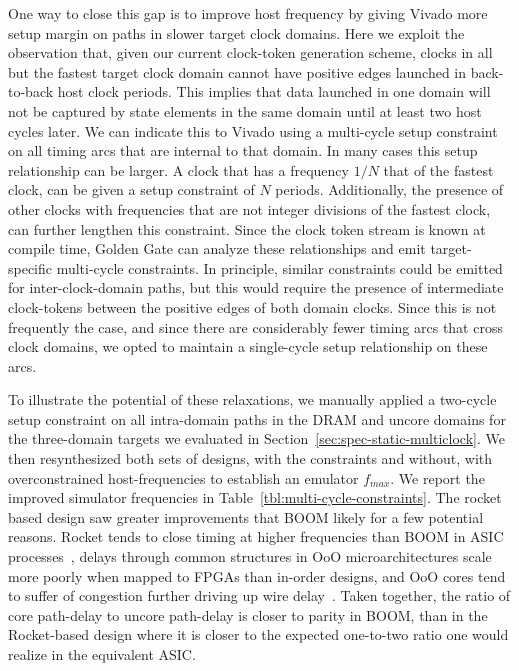 One way to close this gap is to improve host frequency by giving Vivado more
setup margin on paths in slower target clock domains. Here we exploit the
observation that, given our current clock-token generation scheme, clocks in
all but the fastest target clock domain cannot have positive edges launched in
back-to-back host clock periods. This implies that data launched in one domain
will not be captured by state elements in the same domain until at least two
host cycles later. We can indicate this to Vivado using a multi-cycle setup
constraint on all timing arcs that are internal to that domain. In many cases
this setup relationship can be larger. A clock that has a frequency $1/N$ that
of the fastest clock, can be given a setup constraint of $N$ periods.
Additionally, the presence of other clocks with frequencies that are not
integer divisions of the fastest clock, can further lengthen this constraint.
Since the clock token stream is known at compile time, Golden Gate can analyze
these relationships and emit target-specific multi-cycle constraints.  In
principle, similar constraints could be emitted for inter-clock-domain paths,
but this would require the presence of intermediate clock-tokens between the
positive edges of both domain clocks. Since this is not frequently the case,
and since there are considerably fewer timing arcs that cross clock domains, we
opted to maintain a single-cycle setup relationship on these arcs.

To illustrate the potential of these relaxations, we manually applied a
two-cycle setup constraint on all intra-domain paths in the DRAM and uncore
domains for the three-domain targets we evaluated in
Section~\ref{sec:spec-static-multiclock}. We then resynthesized both sets of
designs, with the constraints and without, with overconstrained
host-frequencies to establish an emulator $f_{max}$. We report the improved
simulator frequencies in Table~\ref{tbl:multi-cycle-constraints}. The rocket
based design saw greater improvements that BOOM likely for a few potential
reasons. Rocket tends to close timing at higher frequencies than BOOM in ASIC
processes~, delays through common structures in OoO microarchitectures scale
more poorly when mapped to FPGAs than in-order designs, and OoO cores tend to
suffer of congestion further driving up wire delay~. Taken together, the ratio
of core path-delay to uncore path-delay is closer to parity in BOOM, than in
the Rocket-based design where it is closer to the expected one-to-two ratio one
would realize in the equivalent ASIC.


